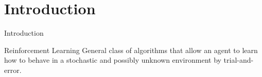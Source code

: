 \section{Introduction}
\label{sec:introduction}

\begin{frame}{Introduction}

	\begin{block}{Reinforcement Learning}
		General class of algorithms that allow an agent to learn how to behave
		in a stochastic and possibly unknown environment by trial-and-error.
	\end{block}

\end{frame}
